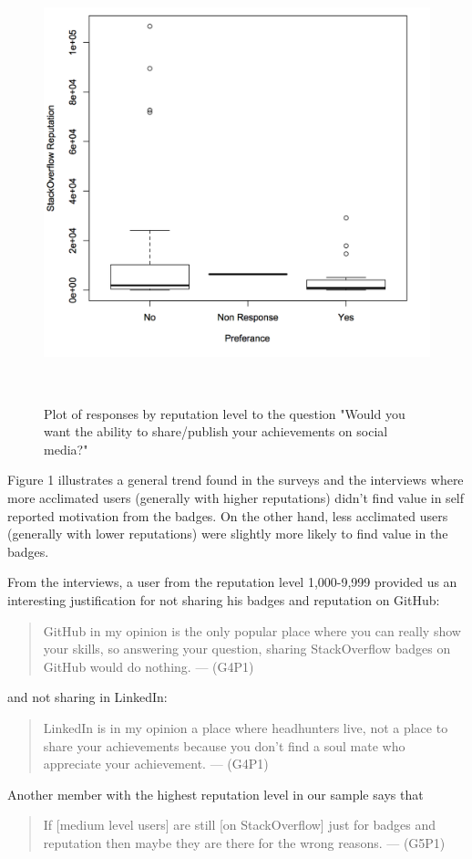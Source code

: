 \documentclass{sigchi}
\begin{document}
\begin{figure}
	\centering
	\includegraphics[width=0.9\columnwidth]{assets/boxplot_reputation_compare_publish_reputation_bool}
	\caption{Plot of responses by reputation level to the question "Would you want the ability to share/publish your achievements on social media?"}~\label{fig:figure1}
\end{figure}

Figure 1 illustrates a general trend found in the surveys and the interviews where more acclimated users (generally with higher reputations) didn't find value in self reported motivation from the badges. On the other hand, less acclimated users (generally with lower reputations) were slightly more likely to find value in the badges.

From the interviews, a user from the reputation level 1,000-9,999 provided us an interesting justification for not sharing his badges and reputation on GitHub:
\begin{quote}
GitHub in my opinion is the only popular place where you can really show your skills, so answering your question, sharing StackOverflow badges on GitHub would do nothing. --- (G4P1)
\end{quote}
and not sharing in LinkedIn:
\begin{quote}
LinkedIn is in my opinion a place where headhunters live, not a place to share your achievements because you don’t find a soul mate who appreciate your achievement. --- (G4P1)
\end{quote}
Another member with the highest reputation level in our sample says that
\begin{quote}
 If [medium level users] are still [on StackOverflow] just for badges and reputation then maybe they are there for the wrong reasons. --- (G5P1)
 \end{quote}
\end{document}
